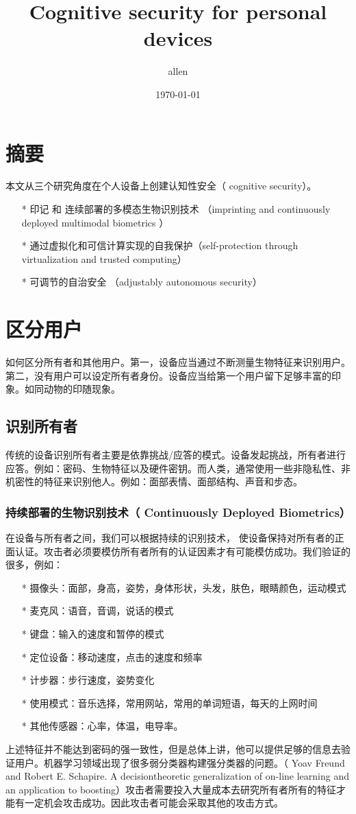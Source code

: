 \documentclass[UTF8]{ctexart}
\title{\heiti Cognitive security for personal devices}
\author{\kaishu allen}
\date{\today}
\begin{document}
    
    \maketitle

    \clearpage
    \section{摘要}\label{sec:diyijie}
  	本文从三个研究角度在个人设备上创建认知性安全（ cognitive security）。
    \begin{itemize}
    \item[*] 印记 和 连续部署的多模态生物识别技术 （imprinting and continuously deployed multimodal biometrics ）
    \item[*] 通过虚拟化和可信计算实现的自我保护（self-protection through virtualization and trusted computing）
    \item[*] 可调节的自治安全 （adjustably autonomous security）
    \end{itemize}
	\clearpage
    \section{区分用户}\label{sec:dierjie}
    如何区分所有者和其他用户。第一，设备应当通过不断测量生物特征来识别用户。第二，没有用户可以设定所有者身份。设备应当给第一个用户留下足够丰富的印象。如同动物的印随现象。
    \subsection{识别所有者}
    传统的设备识别所有者主要是依靠挑战/应答的模式。设备发起挑战，所有者进行应答。例如：密码、生物特征以及硬件密钥。而人类，通常使用一些非隐私性、非机密性的特征来识别他人。例如：面部表情、面部结构、声音和步态。 
    \subsubsection{持续部署的生物识别技术（ Continuously Deployed Biometrics）}
    在设备与所有者之间，我们可以根据持续的识别技术， 使设备保持对所有者的正面认证。攻击者必须要模仿所有者所有的认证因素才有可能模仿成功。我们验证的很多，例如：
    \begin{itemize}
    \item[*] 摄像头：面部，身高，姿势，身体形状，头发，肤色，眼睛颜色，运动模式
    \item[*] 麦克风：语音，音调，说话的模式
    \item[*] 键盘：输入的速度和暂停的模式
    \item[*] 定位设备：移动速度，点击的速度和频率
    \item[*] 计步器：步行速度，姿势变化
    \item[*] 使用模式：音乐选择，常用网站，常用的单词短语，每天的上网时间
    \item[*] 其他传感器：心率，体温，电导率。
    \end{itemize}
    上述特征并不能达到密码的强一致性，但是总体上讲，他可以提供足够的信息去验证用户。机器学习领域出现了很多弱分类器构建强分类器的问题。（ Yoav Freund and Robert E. Schapire. A decisiontheoretic generalization of on-line learning and an application to boosting）攻击者需要投入大量成本去研究所有者所有的特征才能有一定机会攻击成功。因此攻击者可能会采取其他的攻击方式。
\end{document}
